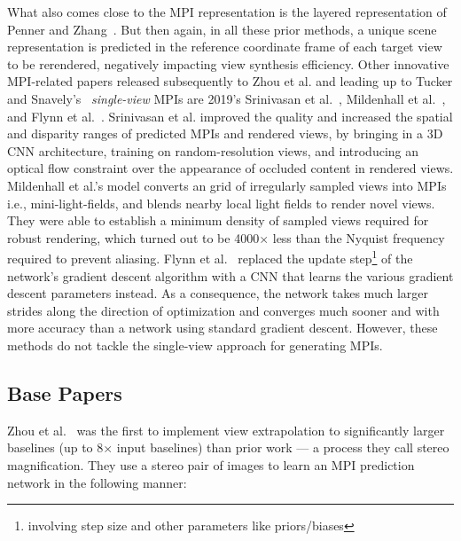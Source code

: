What also comes close to the MPI representation is the layered representation of Penner and Zhang~\cite{penner_soft_2017}. But then again, in all these prior methods, a unique scene representation is predicted in the reference coordinate frame of each target view to be rerendered, negatively impacting view synthesis efficiency. Other innovative MPI-related papers released subsequently to Zhou et al. and leading up to Tucker and Snavely's~\cite{single_view_mpi} \textit{single-view} MPIs are 2019's Srinivasan et al.~\cite{srinivasan_pushing_2019}, Mildenhall et al.~\cite{mildenhall_local_2019}, and Flynn et al.~\cite{flynn_deepview_2019}. Srinivasan et al. improved the quality and increased the spatial and disparity ranges of predicted MPIs and rendered views, by bringing in a 3D CNN architecture, training on random-resolution views, and introducing an optical flow constraint over the appearance of occluded content in rendered views. Mildenhall et al.'s model converts an grid of irregularly sampled views into MPIs i.e., mini-light-fields, and blends nearby local light fields to render novel views. They were able to establish a minimum density of sampled views required for robust rendering, which turned out to be 4000$\times$ less than the Nyquist frequency required to prevent aliasing. Flynn et al.~\cite{flynn_deepview_2019} replaced the update step\footnote{involving step size and other parameters like priors/biases} of the network's gradient descent algorithm with a CNN that learns the various gradient descent parameters instead. As a consequence, the network takes much larger strides along the direction of optimization and converges much sooner and with more accuracy than a network using standard gradient descent. However, these methods do not tackle the single-view approach for generating MPIs.

\subsection{Base Papers}\label{subsec:base-papers}

Zhou et al.~\cite{zhou2018stereo} was the first to implement view extrapolation to significantly larger baselines (up to 8$\times$ input baselines) than prior work --- a process they call stereo magnification. They use a stereo pair of images to learn an MPI prediction network in the following manner:

